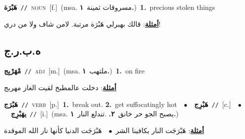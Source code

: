 \documentclass[10pt,a4paper,twoside]{article} %
\begin{document}
\begin{multicols}{2}
{{{\setlength\topsep{0pt}\textbf{\foreignlanguage{arabic}{هَبْرَة}}\ {\color{gray}\texttt{//}\color{black}}\ \textsc{noun}\ [f.]\ \color{gray}(msa. \foreignlanguage{arabic}{مسروقات ثمينة}~\foreignlanguage{arabic}{\textbf{١.}})\color{black}\ \textbf{1.}~precious stolen things\  \begin{flushright}\color{gray}\foreignlanguage{arabic}{\textbf{\underline{\foreignlanguage{arabic}{أمثلة}}}: قالك بهبرلي هَبْرَة  مرتبة. لامن شاف ولا من دري!}\end{flushright}\color{black}} \vspace{2mm}

\vspace{-3mm}
\subsection*{\color{blue}\foreignlanguage{arabic}{ه.ب.ر.ج}\color{blue}{}} 

{\setlength\topsep{0pt}\textbf{\foreignlanguage{arabic}{مْهَرْبِج}}\ {\color{gray}\texttt{//}\color{black}}\ \textsc{adj}\ [m.]\ \color{gray}(msa. \foreignlanguage{arabic}{ملتهب}~\foreignlanguage{arabic}{\textbf{١.}})\color{black}\ \textbf{1.}~on fire\  \begin{flushright}\color{gray}\foreignlanguage{arabic}{\textbf{\underline{\foreignlanguage{arabic}{أمثلة}}}: دخلت عالمطبخ لقيت الغاز مهربج}\end{flushright}\color{black}} \vspace{2mm}

{\setlength\topsep{0pt}\textbf{\foreignlanguage{arabic}{هَبْرَج}}\ {\color{gray}\texttt{//}\color{black}}\ \textsc{verb}\ [p.]\ \textbf{1.}~break out.  \textbf{2.}~get suffocatingly hot\ \ $\bullet$\ \ \setlength\topsep{0pt}\textbf{\foreignlanguage{arabic}{هَبْرِج}}\ {\color{gray}\texttt{//}\color{black}}\ [c.]\ \ $\bullet$\ \ \setlength\topsep{0pt}\textbf{\foreignlanguage{arabic}{يهَبْرِج}}\ {\color{gray}\texttt{//}\color{black}}\ [i.]\ \color{gray}(msa. \foreignlanguage{arabic}{يصبح الجو حر خانق}~\foreignlanguage{arabic}{\textbf{٢.}}  .\foreignlanguage{arabic}{تندلع النار}~\foreignlanguage{arabic}{\textbf{١.}})\color{black}\  \begin{flushright}\color{gray}\foreignlanguage{arabic}{\textbf{\underline{\foreignlanguage{arabic}{أمثلة}}}: هَبْرَجَت النار يكافينا الشر\ $\bullet$\ \  هَبْرَجَت الدنيا كأنها نار الله الموقدة}\end{flushright}\color{black}} \vspace{2mm}

}}
\end{multicols}
\end{document}
